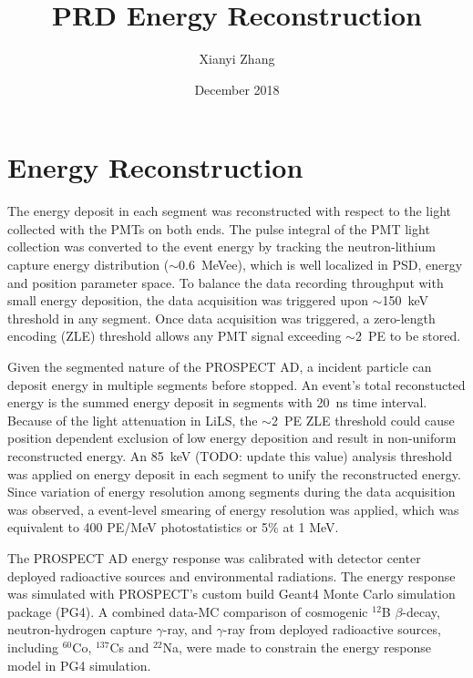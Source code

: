 \documentclass{article}
\title{PRD Energy Reconstruction}
\author{Xianyi Zhang}
\date{December 2018}
\begin{document}
\maketitle

\section{Energy Reconstruction}
The energy deposit in each segment was reconstructed with respect to the light collected with the PMTs on both ends.
The pulse integral of the PMT light collection was converted to the event energy by tracking the neutron-lithium capture energy distribution ($\sim$0.6~MeVee), which is well localized in PSD, energy and position parameter space.
To balance the data recording throughput with small energy deposition, the data acquisition was triggered upon $\sim$150~keV threshold in any segment. 
Once data acquisition was triggered, a zero-length encoding (ZLE) threshold allows any PMT signal exceeding $\sim$2~PE to be stored.

Given the segmented nature of the PROSPECT AD, a incident particle can deposit energy in multiple segments before stopped.
An event's total reconstucted energy is the summed energy deposit in segments with 20~ns time interval.
Because of the light attenuation in LiLS, the $\sim$2~PE ZLE threshold could cause position dependent exclusion of low energy deposition and result in non-uniform reconstructed energy.
An 85~keV (TODO: update this value) analysis threshold was applied on energy deposit in each segment to unify the reconstructed energy.
Since variation of energy resolution among segments during the data acquisition was observed, a event-level smearing of energy resolution was applied, which was equivalent to 400 PE/MeV photostatistics or 5\% at 1 MeV.

The PROSPECT AD energy response was calibrated with detector center deployed radioactive sources and environmental radiations.
The energy response was simulated with PROSPECT's custom build Geant4 Monte Carlo simulation package (PG4).
A combined data-MC comparison of cosmogenic $^{12}$B $\beta$-decay, neutron-hydrogen capture $\gamma$-ray, and $\gamma$-ray from deployed radioactive sources, including $^{60}$Co, $^{137}$Cs and $^{22}$Na, were made to constrain the energy response model in PG4 simulation.
\end{document}

